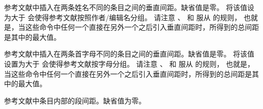 \begin{ltxsyntax}
参考文献中插入在两条姓名不同的条目之间的垂直间距。缺省值是零。
将该值设为大于  会使得参考文献按照作者/编辑名分组。
请注意 、 和  服从  的规则，
也就是，当这些命令中任何一个直接在另外一个之后引入垂直间距时，所得到的总间距是其中的最大值。



参考文献中插入在两条首字母不同的条目之间的垂直间距。缺省值是零。
将该值设置为大于  会使得参考文献按字母分组。
请注意 、 和  服从  的规则，
也就是，当这些命令中任何一个直接在另外一个之后引入垂直间距时，所得到的总间距是其中的最大值。



参考文献中条目内部的段间距。缺省值为零。




\end{ltxsyntax}
